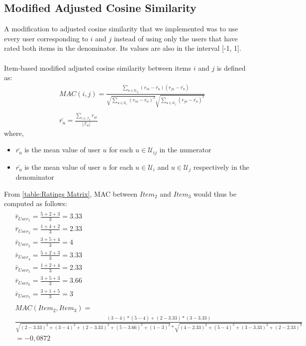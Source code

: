 \subsection{Modified Adjusted Cosine Similarity}
A modification to adjusted cosine similarity that we implemented was to
use every user corresponding to $i$ and $j$ instead of using
only the users that have rated both items in the denominator. Its values are also in the interval [-1, 1].\\\\
Item-based modified adjusted cosine similarity between items $i$ and $j$ is defined as:
\begin{equation}
\begin{split}
&MAC(i,j) = \frac{\sum_{u \in \mathcal{U}_{ij}}(r_{iu}-\bar{r_{u}})(r_{ju}-\bar{r_{u}})}
				 {\sqrt{\sum_{u \in \mathcal{U}_{i}}(r_{iu}-\bar{r_{u}})^2}
				  \sqrt{\sum_{u \in \mathcal{U}_{j}}(r_{ju}-\bar{r_{u}})^2}} \\\\
&\bar{r_{u}} = \frac{\sum_{i \in \mathcal{I}_u}r_{ui}}
					{\mathopen|\mathcal{I}_u\mathclose|}
\end{split}
\end{equation}
where,
\begin{itemize}
	\item[] $\bar{r_u}$ is the mean value of user $u$ for each $u \in \mathcal{U}_{ij}$ in the numerator
	\item[] $\bar{r_u}$ is the mean value of user $u$ for each $u \in \mathcal{U}_{i}$ and $u \in \mathcal{U}_{j}$ respectively in the denominator
\end{itemize}
From \autoref{table:Ratings Matrix}, MAC
between $Item_2$ and $Item_3$ would thus be computed as follows:
\footnotesize
\begin{align*}
	\begin{split}
		&\bar{r}_{User_1} = \frac{5 + 2 + 3}{3} = 3.33\\
		&\bar{r}_{User_2} = \frac{1 + 4 + 2}{3} = 2.33\\
		&\bar{r}_{User_3} = \frac{3 + 5 + 4}{3} = 4\\
		&\bar{r}_{User_4} = \frac{5 + 2 + 3}{3} = 3.33\\
		&\bar{r}_{User_5} = \frac{1 + 2 + 4}{3} = 2.33\\
		&\bar{r}_{User_6} = \frac{3 + 5 + 3}{3} = 3.66\\
		&\bar{r}_{User_7} = \frac{3 + 1 + 5}{3} = 3\\\\
&MAC(Item_2,Item_3) = \\&\frac{(3 - 4)*(5 - 4) + (2 - 3.33)*(3 - 3.33)}
						 {\sqrt{(2 - 3.33)^2 + (3 - 4)^2 + (2 - 3.33)^2 + (5 - 3.66)^2 + (1 - 3)^2}*
						  \sqrt{(4 - 2.33)^2 + (5 - 4)^2 + (3 - 3.33)^2 + (2 - 2.33)^2}} \\&= −0,0872
  \end{split}
\end{align*}

